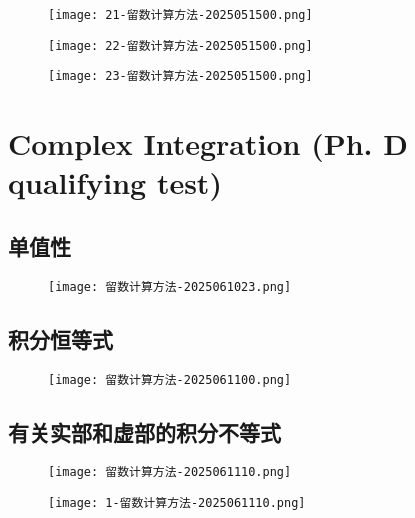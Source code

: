 \begin{figure}[H]
\centering
\texttt{[image: 21-留数计算方法-2025051500.png]}
\label{}
\end{figure}

\begin{figure}[H]
\centering
\texttt{[image: 22-留数计算方法-2025051500.png]}
\label{}
\end{figure}

\begin{figure}[H]
\centering
\texttt{[image: 23-留数计算方法-2025051500.png]}
\label{}
\end{figure}

\section{Complex Integration (Ph. D qualifying test)}

\subsection{单值性}

\begin{figure}[H]
\centering
\texttt{[image: 留数计算方法-2025061023.png]}
\label{}
\end{figure}

\subsection{积分恒等式}

\begin{figure}[H]
\centering
\texttt{[image: 留数计算方法-2025061100.png]}
\label{}
\end{figure}

\subsection{有关实部和虚部的积分不等式}

\begin{figure}[H]
\centering
\texttt{[image: 留数计算方法-2025061110.png]}
\label{}
\end{figure}
\begin{figure}[H]
\centering
\texttt{[image: 1-留数计算方法-2025061110.png]}
\label{}
\end{figure}

